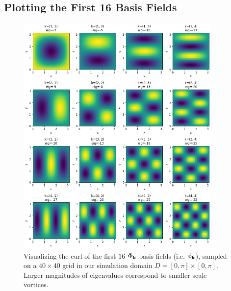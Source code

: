 \appendix
\chapter*{\fuggelek}
\setcounter{chapter}{\appendixnumber}

\section{Plotting the First 16 Basis Fields}
\label{appendix:first_16}

\begin{figure}[!htb]
  \centering
    \includegraphics[width=0.9\textwidth]{figures/eigenfluids/16_basis_fields.png}
    \caption{Visualizing the curl of the first $16$ $\Phi_{\vb{k}}$ basis fields
    (i.e. $\phi_{\vb{k}}$), sampled on a $40 \times 40$ grid in our simulation
  domain $D = [0,\pi] \times [0,\pi]$.  Larger magnitudes of eigenvalues
correspond to smaller scale vortices.}
\end{figure}
